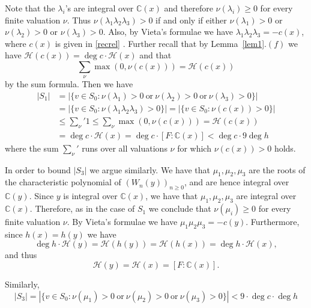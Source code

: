 \documentclass[12pt]{amsart}
\begin{document}
Note that the $\lambda_{i}$’s are integral over $\mathbb{C}(x)$ and therefore $\nu(\lambda_{i}) \geq 0$ 
for every finite valuation $\nu$. Thus $\nu(\lambda_1\lambda_2\lambda_3) > 0$ if and only if either 
$\nu(\lambda_1) > 0$ or $\nu(\lambda_2) > 0$ or $\nu(\lambda_3) > 0$. Also, by Vieta’s formulae we have $\lambda_{1}\lambda_{2}\lambda_3 = -c(x)$, where $c(x)$ is given in \eqref{recrel} . Further recall that by Lemma~\ref{lem1}.$(f)$ we have 
$\mathcal{H}(c(x)) = \deg c \cdot \mathcal{H}(x)$ and that 
\[
\sum_{\nu} \max(0,\nu(c(x))) = \mathcal{H}(c(x))
\]
by the sum formula. Then we have
\begin{align*}
    |S_{1}|& = |\{ v \in S_{0} : \nu(\lambda_{1}) > 0 \ \text{or}\ \nu(\lambda_{2}) > 0 \ \text{or}\ \nu(\lambda_{3}) > 0 \}|\\
    &=|\{ v \in S_{0} : \nu(\lambda_{1}\lambda_{2}\lambda_{3}) > 0\}|= |\{ v \in S_{0} : \nu(c(x)) > 0\}|\\
    &\leq \sum_{\nu}{'}1 \leq \sum_{\nu} \max(0,\nu(c(x))) = \mathcal{H}(c(x))\\
    &= \deg c \cdot \mathcal{H}(x) = \deg c \cdot [F:\mathbb{C}(x)] 
< \deg c \cdot 9 \deg h
\end{align*}
where the sum $\sum_{\nu}'$ runs over all valuations $\nu$ 
for which $\nu(c(x)) > 0$ holds.

In order to bound $|S_{3}|$ we argue similarly. We have that $\mu_1,\mu_2,\mu_3$ are the roots 
of the characteristic polynomial of $(W_{n}(y))_{n\geq 0}$, and are hence integral over $\mathbb{C}(y)$. 
Since $y$ is integral over $\mathbb{C}(x)$, we have that $\mu_1,\mu_2,\mu_3$ are integral over $\mathbb{C}(x)$. 
Therefore, as in the case of $S_{1}$ we conclude that $\nu(\mu_{i}) \geq 0$ for every finite valuation $\nu$. 
By Vieta’s formulae we have $\mu_{1}\mu_{2}\mu_3 = -c(y)$. Furthermore, since $h(x) = h(y)$ we have
\[
\deg h \cdot \mathcal{H}(y) = \mathcal{H}(h(y)) = \mathcal{H}(h(x)) = \deg h \cdot \mathcal{H}(x),
\]
and thus
\[
\mathcal{H}(y) = \mathcal{H}(x) = [F:\mathbb{C}(x)].
\]

Similarly,
\begin{equation*}
    |S_{3}| = |\{ v \in S_{0} : \nu(\mu_{1}) > 0 \ \text{or}\ \nu(\mu_{2}) > 0 \ \text{or}\ \nu(\mu_{3}) > 0 \}|<9\cdot \deg c \cdot\deg h
\end{equation*}
\end{document}
